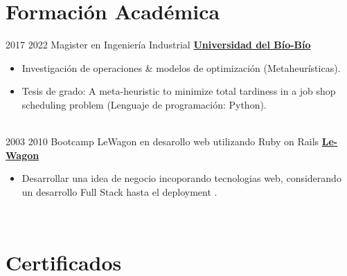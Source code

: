\documentclass[letterpaper]{DS_class_file} %
\begin{document}
\makeprofile %

\section{Formación Académica}

\begin{twenty} %
   	\twentyitem
	    {2017}
		{2022}
	    {\hspace{0.2cm}Magister en Ingeniería Industrial}
	    {\href{https://magister.industrial.ubiobio.cl/}{\hspace{0.27cm} \textbf{Universidad del Bío-Bío} }}
	    {}
	    {\begin{itemize}
			\item Investigación de operaciones \& modelos de optimización (Metaheurísticas).
			\item Tesis de grado: A meta-heuristic to minimize total tardiness in a job shop scheduling problem (Lenguaje de programación: Python).
		\end{itemize}} 
		\\
	   	\twentyitem
			{2003}
			{2010}
			{\hspace{0.2cm}Bootcamp LeWagon en desarollo web utilizando Ruby on Rails}
			{\href{https://www.lewagon.com}{\hspace{0.27cm} \textbf{Le-Wagon} }}
			{}
			{\begin{itemize}
					\item Desarrollar una idea de negocio incoporando tecnologias web,  considerando un desarrollo Full Stack  hasta el deployment . 
			\end{itemize}} 
			\\
\end{twenty}


\section{Certificados}  
\end{document}
